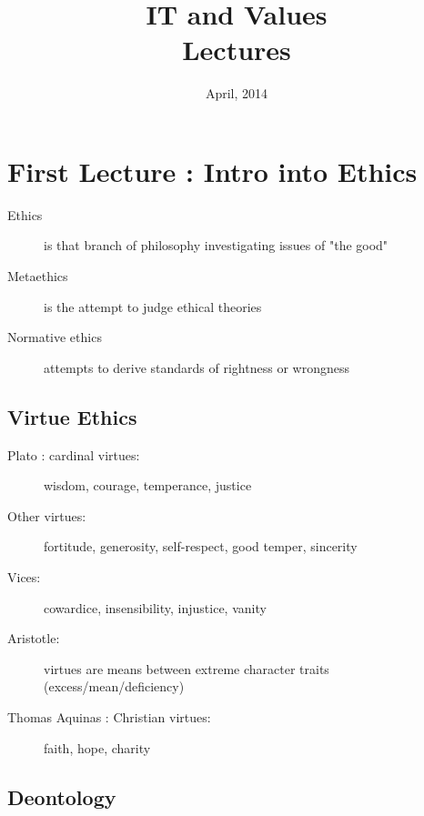 \documentclass[a4paper]{article}
\begin{document}
\title{IT and Values \\ Lectures}
\author{}
\date{April, 2014}
\maketitle

\section{First Lecture : Intro into Ethics}

\begin{description}
\item[Ethics] is that branch of philosophy investigating issues of "the good"
\item[Metaethics] is the attempt to judge ethical theories
\item[Normative ethics] attempts to derive standards of rightness or wrongness
\end{description}

\subsection*{Virtue Ethics}

\begin{description}
\item[Plato : cardinal virtues:] wisdom, courage, temperance, justice
\item[Other virtues:] fortitude, generosity, self-respect, good temper, sincerity
\item[Vices:] cowardice, insensibility, injustice, vanity
\item[Aristotle:] virtues are means between extreme character traits (excess/mean/deficiency)
\item[Thomas Aquinas : Christian virtues:] faith, hope, charity
\end{description}

\subsection*{Deontology}
\end{document}
